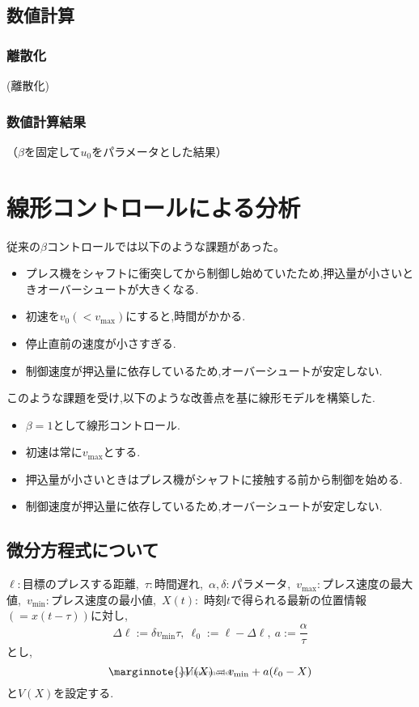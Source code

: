 \documentclass [dvipdfmx] {jsarticle}
\makeatletter
\let\temp@label\label
\def\label#1{\marginnote{\hbox to 0pt{\scriptsize \textcolor{black!60}{#1}\hss}}\temp@label{#1}\ignorespaces}
\numberwithin{equation}{section}
\theoremstyle{definition} %
\theoremstyle{definition} %
\makeatother
\begin{document}
\subsection{数値計算}
\subsubsection{離散化}
(離散化)
\subsubsection{数値計算結果}
（$\beta$を固定して$u_0$をパラメータとした結果）
\section{線形コントロールによる分析}
従来の$\beta$コントロールでは以下のような課題があった。
\begin{itemize}
    \item プレス機をシャフトに衝突してから制御し始めていたため,押込量が小さいときオーバーシュートが大きくなる.
    \item 初速を$v_0(<v_{\max})$にすると,時間がかかる.
    \item 停止直前の速度が小さすぎる.
    \item 制御速度が押込量に依存しているため,オーバーシュートが安定しない.
\end{itemize}
このような課題を受け,以下のような改善点を基に線形モデルを構築した.
\begin{itemize}
    \item $\beta=1$として線形コントロール. 
    \item 初速は常に$v_{\max}$とする.
    \item 押込量が小さいときはプレス機がシャフトに接触する前から制御を始める.
    \item 制御速度が押込量に依存しているため,オーバーシュートが安定しない.
\end{itemize}
\subsection{微分方程式について}
$\ell:$目標のプレスする距離,\ $\tau:$時間遅れ,\ $\alpha,\delta:$パラメータ,\ 
$v_{\max}:$プレス速度の最大値,\ $v_{\min}:$プレス速度の最小値,\ $X(t):$
時刻$t$で得られる最新の位置情報$(=x(t-\tau))$に対し,
\begin{equation}
    \Delta\ell :=\delta v_{\min}\tau,\ \ell_0:=\ell-\Delta\ell,\ a:=\frac{\alpha}{\tau}
\end{equation}
とし,
\begin{equation}\label{eq:linermodel}
    V(X)=v_{\min}+a(\ell_0-X)
\end{equation}
と$V(X)$を設定する.
\end{document}
